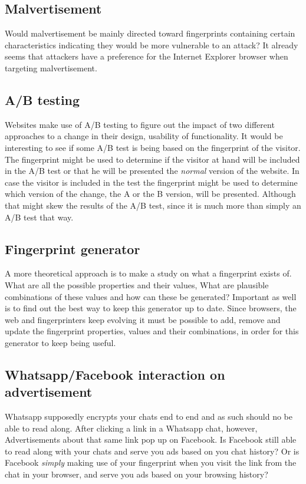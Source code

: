 \subsection{Malvertisement}

Would malvertisement be mainly directed toward
fingerprints containing certain characteristics
indicating they would be more vulnerable to an attack?
It already seems that attackers have a preference
for the Internet Explorer browser
when targeting malvertisement.
\cite{li2012knowing}

\subsection{A/B testing}
Websites make use of A/B testing to figure out the impact
of two different approaches to a change
in their design, usability of functionality.
It would be interesting to see if some A/B test
is being based on the fingerprint of the visitor.
The fingerprint might be used to determine
if the visitor at hand will be included in the A/B test
or that he will be presented the \textit{normal} version of the website.
In case the visitor is included in the test
the fingerprint might be used to determine which version of the change,
the A or the B version, will be presented.
Although that might skew the results of the A/B test,
since it is much more than simply an A/B test that way.

\subsection{Fingerprint generator}
A more theoretical approach is to make a study on what a fingerprint exists of.
What are all the possible properties and their values,
What are plausible combinations of these values
and how can these be generated?
Important as well is to find out the best way
to keep this generator up to date.
Since browsers, the web and fingerprinters keep evolving
it must be possible to add, remove and update
the fingerprint properties, values and their combinations,
in order for this generator to keep being useful.

\subsection{Whatsapp/Facebook interaction on advertisement}
Whatsapp supposedly encrypts your chats end to end
and as such should no be able to read along.
After clicking a link in a Whatsapp chat, however,
Advertisements about that same link pop up on Facebook.
Is Facebook still able to read along with your chats
and serve you ads based on you chat history?
Or is Facebook \textit{simply} making use of your fingerprint
when you visit the link from the chat in your browser,
and serve you ads based on your browsing history?
